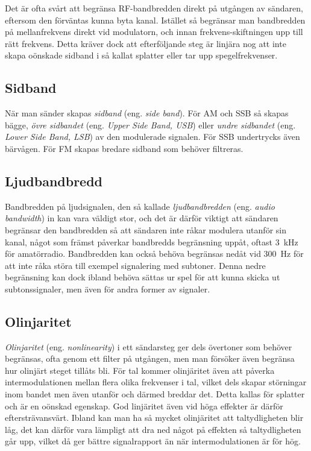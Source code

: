 Det är ofta svårt att begränsa RF-bandbredden direkt på utgången av sändaren,
eftersom den förväntas kunna byta kanal.
Istället så begränsar man bandbredden på mellanfrekvens direkt vid modulatorn,
och innan frekvens-skiftningen upp till rätt frekvens.
Detta kräver dock att efterföljande steg är linjära nog att inte skapa oönskade
sidband i så kallat splatter eller tar upp spegelfrekvenser.

\subsection{Sidband}

När man sänder skapas \emph{sidband} (eng. \emph{side band}).
För AM och SSB så skapas bägge, \emph{övre sidbandet}
(eng. \emph{Upper Side Band, USB}) eller \emph{undre sidbandet}
(eng. \emph{Lower Side Band, LSB}) av den modulerade signalen.
För SSB undertrycks även bärvågen.
För FM skapas bredare sidband som behöver filtreras.

\subsection{Ljudbandbredd}

Bandbredden på ljudsignalen, den så kallade \emph{ljudbandbredden} (eng.
\emph{audio bandwidth}) in kan vara väldigt stor, och det är därför viktigt
att sändaren begränsar den bandbredden så att sändaren inte råkar modulera
utanför sin kanal, något som främst påverkar bandbredds begränsning uppåt,
oftast \qty{3}{\kilo\hertz} för amatörradio.
Bandbredden kan också behöva begränsas nedåt vid \qty{300}{\hertz} för att inte
råka störa till exempel signalering med subtoner.
Denna nedre begränsning kan dock ibland behöva sättas ur spel för att
kunna skicka ut subtonssignaler, men även för andra former av signaler.

\subsection{Olinjaritet}

\emph{Olinjaritet} (eng. \emph{nonlinearity}) i ett sändarsteg ger dels
övertoner som behöver begränsas, ofta genom ett filter på utgången, men man
försöker även begränsa hur olinjärt steget tillåts bli.
För tal kommer olinjäritet även att påverka intermodulationen mellan flera
olika frekvenser i tal, vilket dels skapar störningar inom bandet men även
utanför och därmed breddar det.
Detta kallas för splatter och är en oönskad egenskap.
God linjäritet även vid höga effekter är därför eftersträvansvärt.
Ibland kan man ha så mycket olinjäritet att taltydligheten blir låg, det
kan därför vara lämpligt att dra ned något på effekten så taltydligheten går
upp, vilket då ger bättre signalrapport än när intermodulationen är för hög.


